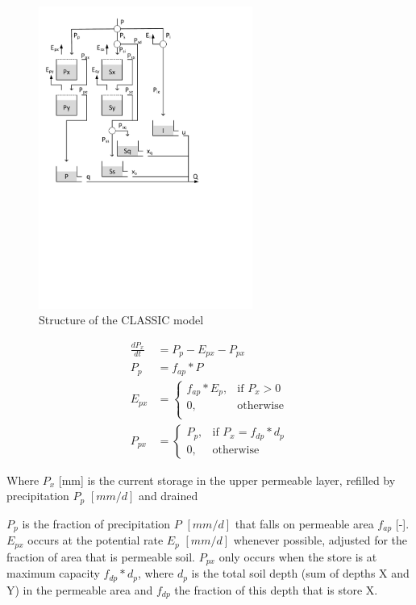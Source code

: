 { 																	%
\begin{figure}
\includegraphics[trim=1cm 12cm 7cm 1cm,width=7cm,keepaspectratio]{./files/46_schematic.pdf}
\caption{Structure of the CLASSIC model} \label{fig:46_schematic}
\end{figure}


\begin{align}
	\frac{dP_x}{dt} &= P_p-E_{px}-P_{px} \\
	P_p &= f_{ap} * P\\
	E_{px} &= 
	\begin{cases}
		f_{ap}*E_p, & \text{if } P_x > 0 \\
		0, & \text{otherwise}\\
	\end{cases}\\
	P_{px} &= 
	\begin{cases}
		P_p, & \text{if } P_x = f_{dp}*d_p \\
		0, & \text{otherwise}
	\end{cases}
\end{align}

Where $P_x$ [mm] is the current storage in the upper permeable layer, refilled by precipitation $P_p$ $[mm/d]$ and drained 

} %

\noindent 
$P_p$ is the fraction of precipitation $P$ $[mm/d]$ that falls on permeable area $f_{ap}$ [-].
$E_{px}$ occurs at the potential rate $E_p$ $[mm/d]$ whenever possible, adjusted for the fraction of area that is permeable soil.
$P_{px}$ only occurs when the store is at maximum capacity $f_{dp}*d_p$, where $d_p$ is the total soil depth (sum of depths X and Y) in the permeable area and $f_{dp}$ the fraction of this depth that is store X.

